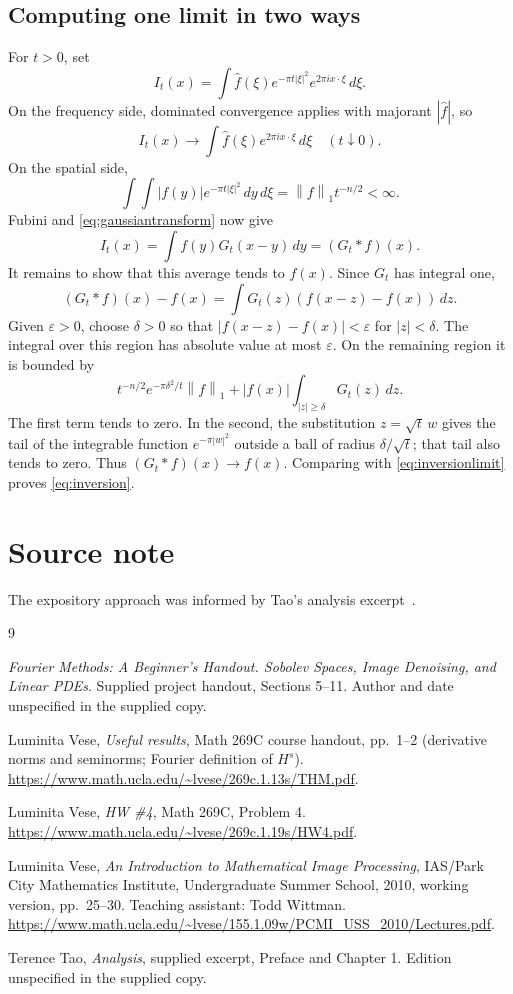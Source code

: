 \documentclass[11pt]{article}
\numberwithin{equation}{section}
\theoremstyle{definition}
\theoremstyle{remark}
\newcommand{\dd}{\,d}
\newcommand{\norm}[1]{\left\|#1\right\|}
\newcommand{\wh}[1]{\widehat{#1}}
\begin{document}
\subsection{Computing one limit in two ways}
For \(t>0\), set
\[
 I_t(x)=\int\wh f(\xi)e^{-\pi t|\xi|^2}e^{2\pi i x\cdot\xi}\dd\xi.
\]
On the frequency side, dominated convergence applies with majorant \(|\wh f|\), so
\begin{equation}\label{eq:inversionlimit}
 I_t(x)\longrightarrow\int\wh f(\xi)e^{2\pi i x\cdot\xi}\dd\xi
                   \quad(t\downarrow0).
\end{equation}
On the spatial side,
\[
 \int\!\int|f(y)|e^{-\pi t|\xi|^2}\dd y\dd\xi
                =\norm f_1t^{-n/2}<\infty.
\]
Fubini and \eqref{eq:gaussiantransform} now give
\[
 I_t(x)=\int f(y)G_t(x-y)\dd y=(G_t*f)(x).
\]
It remains to show that this average tends to \(f(x)\). Since \(G_t\) has integral one,
\[
 (G_t*f)(x)-f(x)=\int G_t(z)(f(x-z)-f(x))\dd z.
\]
Given \(\varepsilon>0\), choose \(\delta>0\) so that
\(|f(x-z)-f(x)|<\varepsilon\) for \(|z|<\delta\). The integral over this region has absolute value at most \(\varepsilon\). On the remaining region it is bounded by
\[
 t^{-n/2}e^{-\pi\delta^2/t}\norm f_1
       +|f(x)|\int_{|z|\ge\delta}G_t(z)\dd z.
\]
The first term tends to zero. In the second, the substitution \(z=\sqrt t\,w\) gives the tail of the integrable function \(e^{-\pi|w|^2}\) outside a ball of radius \(\delta/\sqrt t\); that tail also tends to zero. Thus
\((G_t*f)(x)\to f(x)\). Comparing with \eqref{eq:inversionlimit} proves \eqref{eq:inversion}.

\clearpage
\section*{Source note}
The expository approach was informed by Tao's analysis excerpt~\cite{tao}.

\begin{thebibliography}{9}
\emph{Fourier Methods: A Beginner's Handout. Sobolev Spaces, Image Denoising, and Linear PDEs}. Supplied project handout, Sections 5--11. Author and date unspecified in the supplied copy.

Luminita Vese, \emph{Useful results}, Math 269C course handout, pp.~1--2 (derivative norms and seminorms; Fourier definition of \(H^s\)).
\url{https://www.math.ucla.edu/~lvese/269c.1.13s/THM.pdf}.

Luminita Vese, \emph{HW \#4}, Math 269C, Problem 4.
\url{https://www.math.ucla.edu/~lvese/269c.1.19s/HW4.pdf}.

Luminita Vese,
\emph{An Introduction to Mathematical Image Processing}, IAS/Park City Mathematics Institute, Undergraduate Summer School, 2010, working version, pp.~25--30. Teaching assistant: Todd Wittman.
\url{https://www.math.ucla.edu/~lvese/155.1.09w/PCMI_USS_2010/Lectures.pdf}.

Terence Tao, \emph{Analysis}, supplied excerpt, Preface and Chapter 1. Edition unspecified in the supplied copy.
\end{thebibliography}
\end{document}
